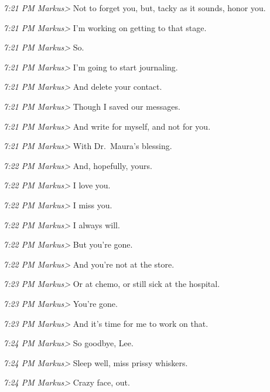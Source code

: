 {\emph{7:21 PM Markus\textgreater{}} Not to forget you, but, tacky as it
sounds, honor you.

\emph{7:21 PM Markus\textgreater{}} I'm working on getting to that
stage.

\emph{7:21 PM Markus\textgreater{}} So.

\emph{7:21 PM Markus\textgreater{}} I'm going to start journaling.

\emph{7:21 PM Markus\textgreater{}} And delete your contact.

\emph{7:21 PM Markus\textgreater{}} Though I saved our messages.

\emph{7:21 PM Markus\textgreater{}} And write for myself, and not for
you.

\emph{7:21 PM Markus\textgreater{}} With Dr.~Maura's blessing.

\emph{7:22 PM Markus\textgreater{}} And, hopefully, yours.

\emph{7:22 PM Markus\textgreater{}} I love you.

\emph{7:22 PM Markus\textgreater{}} I miss you.

\emph{7:22 PM Markus\textgreater{}} I always will.

\emph{7:22 PM Markus\textgreater{}} But you're gone.

\emph{7:22 PM Markus\textgreater{}} And you're not at the store.

\emph{7:23 PM Markus\textgreater{}} Or at chemo, or still sick at the
hospital.

\emph{7:23 PM Markus\textgreater{}} You're gone.

\emph{7:23 PM Markus\textgreater{}} And it's time for me to work on
that.

\emph{7:24 PM Markus\textgreater{}} So goodbye, Lee.

\emph{7:24 PM Markus\textgreater{}} Sleep well, miss prissy whiskers.

\emph{7:24 PM Markus\textgreater{}} Crazy face, out.

} %
